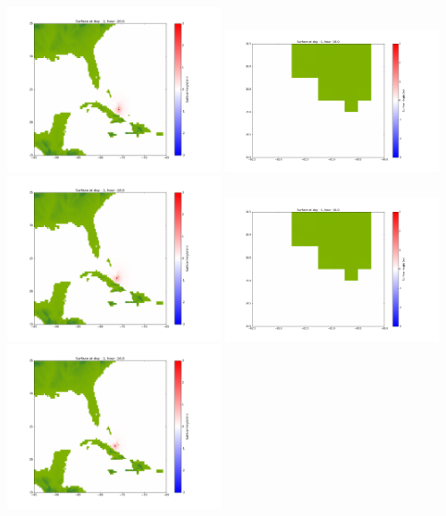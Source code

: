 \documentclass[11pt]{article}
\begin{document}
\includegraphics[width=0.475\textwidth]{frame0002fig1002.png}
\vskip 10pt 
\includegraphics[width=0.475\textwidth]{frame0003fig1001.png}
\includegraphics[width=0.475\textwidth]{frame0003fig1002.png}
\vskip 10pt 
\includegraphics[width=0.475\textwidth]{frame0004fig1001.png}
\includegraphics[width=0.475\textwidth]{frame0004fig1002.png}
\end{document}
